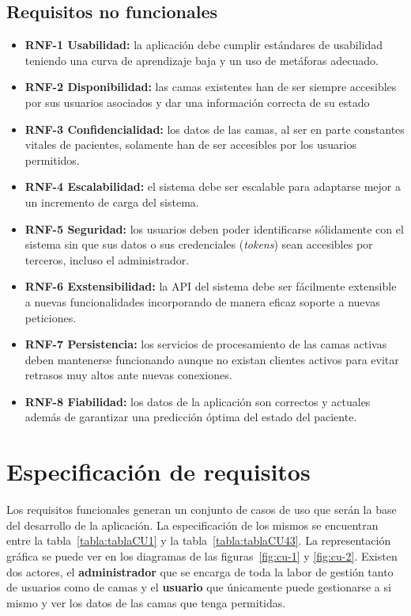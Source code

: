 \subsection{Requisitos no funcionales}\label{requisitos-no-funcionales}
\begin{itemize}
\tightlist
\item
\textbf{RNF-1 Usabilidad:} la aplicación debe cumplir estándares de usabilidad teniendo una curva de aprendizaje baja y un uso de metáforas adecuado.
\item 
\textbf{RNF-2 Disponibilidad:} las camas existentes han de ser siempre accesibles por sus usuarios asociados y dar una información correcta de su estado
\item 
\textbf{RNF-3 Confidencialidad:} los datos de las camas, al ser en parte constantes vitales de pacientes, solamente han de ser accesibles por los usuarios permitidos.
\item
\textbf{RNF-4 Escalabilidad:} el sistema debe ser escalable para adaptarse mejor a un incremento de carga del sistema.
\item 
\textbf{RNF-5 Seguridad:} los usuarios deben poder identificarse sólidamente con el sistema sin que sus datos o sus credenciales (\textit{tokens}) sean accesibles por terceros, incluso el administrador.
\item
\textbf{RNF-6 Exstensibilidad:} la API del sistema debe ser fácilmente extensible a nuevas funcionalidades incorporando de manera eficaz soporte a nuevas peticiones.
\item
\textbf{RNF-7 Persistencia:} los servicios de procesamiento de las camas activas deben mantenerse funcionando aunque no existan clientes activos para evitar retrasos muy altos ante nuevas conexiones.
\item
\textbf{RNF-8 Fiabilidad:} los datos de la aplicación son correctos y actuales además de garantizar una predicción óptima del estado del paciente.
\end{itemize}

\section{Especificación de requisitos}\label{casos-uso}

Los requisitos funcionales generan un conjunto de casos de uso que serán la base del desarrollo de la aplicación. La especificación de los mismos se encuentran entre la tabla~\ref{tabla:tablaCU1} y la tabla~\ref{tabla:tablaCU43}. La representación gráfica se puede ver en los diagramas de las figuras~\ref{fig:cu-1} y \ref{fig:cu-2}. Existen dos actores, el \textbf{administrador} que se encarga de toda la labor de gestión tanto de usuarios como de camas y el \textbf{usuario} que únicamente puede gestionarse a si mismo y ver los datos de las camas que tenga permitidas.

